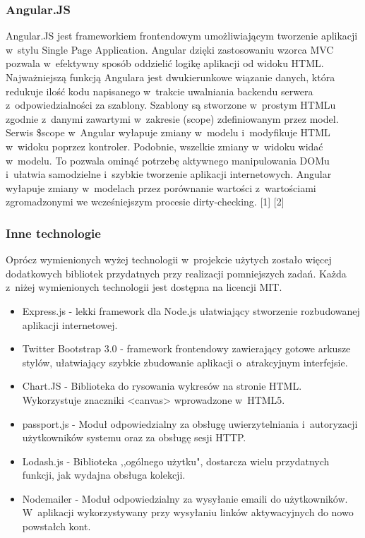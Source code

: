 \documentclass[8pt,a4paper,notitlepage]{article}
\begin{document}
\subsubsection{Angular.JS}
Angular.JS jest frameworkiem frontendowym umożliwiającym tworzenie aplikacji w~stylu Single Page Application. Angular dzięki zastosowaniu wzorca MVC pozwala w~efektywny sposób oddzielić logikę aplikacji od widoku HTML. Najważniejszą funkcją Angulara jest dwukierunkowe wiązanie danych, która redukuje ilość kodu napisanego w~trakcie uwalniania backendu serwera z~odpowiedzialności za szablony. Szablony są stworzone w~prostym HTMLu zgodnie z~danymi zawartymi w~zakresie (scope) zdefiniowanym przez model. Serwis \$scope w~Angular wyłapuje zmiany w~modelu i~modyfikuje HTML w~widoku poprzez kontroler. Podobnie, wszelkie zmiany w~widoku widać w~modelu. To pozwala ominąć potrzebę aktywnego manipulowania DOMu i~ułatwia samodzielne i~szybkie tworzenie aplikacji internetowych. Angular wyłapuje zmiany w~modelach przez porównanie wartości z~wartościami zgromadzonymi we wcześniejszym procesie dirty-checking. [1] [2]

\subsubsection{Inne technologie}
Oprócz wymienionych wyżej technologii w~projekcie użytych zostało więcej dodatkowych bibliotek przydatnych przy realizacji pomniejszych zadań. Każda z~niżej wymienionych technologii jest dostępna na licencji MIT.

\begin{itemize}
\item Express.js - lekki framework dla Node.js ułatwiający stworzenie rozbudowanej aplikacji internetowej.
\item Twitter Bootstrap 3.0 - framework frontendowy zawierający gotowe arkusze stylów, ułatwiający szybkie zbudowanie aplikacji o~atrakcyjnym interfejsie.
\item Chart.JS - Biblioteka do rysowania wykresów na stronie HTML. Wykorzystuje znaczniki <canvas> wprowadzone w~HTML5.
\item passport.js - Moduł odpowiedzialny za obsługę uwierzytelniania i~autoryzacji użytkowników systemu oraz za obsługę sesji HTTP.
\item Lodash.js - Biblioteka ,,ogólnego użytku", dostarcza wielu przydatnych funkcji, jak wydajna obsługa kolekcji.
\item Nodemailer - Moduł odpowiedzialny za wysyłanie emaili do użytkowników. W~aplikacji wykorzystywany przy wysyłaniu linków aktywacyjnych do nowo powstałch kont.
\end{itemize}
\end{document}
